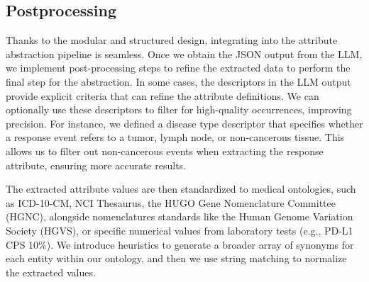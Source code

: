 \subsection{Postprocessing \label{subsection: integrating LLM}}

Thanks to the modular and structured design, integrating \ours into the attribute abstraction pipeline is seamless. Once we obtain the JSON output from the \ac{LLM}, we implement post-processing steps to refine the extracted data to perform the final step for the abstraction.
In some cases, the descriptors in the \ac{LLM} output provide explicit criteria that can refine the attribute definitions. We can optionally use these descriptors to filter for high-quality occurrences, improving precision. For instance, we defined a disease type descriptor that specifies whether a response event refers to a tumor, lymph node, or non-cancerous tissue. This allows us to filter out non-cancerous events when extracting the response attribute, ensuring more accurate results.

The extracted attribute values are then standardized to medical ontologies, such as ICD-10-CM, NCI Thesaurus, the HUGO Gene Nomenclature Committee (HGNC), alongside nomenclatures standards like the Human Genome Variation Society (HGVS), or specific numerical values from laboratory tests (e.g., PD-L1 CPS 10\%). We introduce heuristics to generate a broader array of synonyms for each entity within our ontology, and then we use string matching to normalize the extracted values. 




